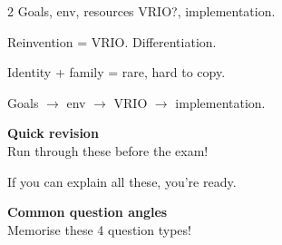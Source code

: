 \documentclass[8pt,landscape,a4paper]{article}
\begin{document}
\begin{multicols}{2}
Goals, env, resources VRIO?, implementation.

Reinvention = VRIO. Differentiation.

Identity + family = rare, hard to copy.

Goals $\to$ env $\to$ VRIO $\to$ implementation.

\textbf{Quick revision}\\
Run through these before the exam!

If you can explain all these, you're ready.

\textbf{Common question angles}\\
Memorise these 4 question types!

\end{multicols}
\vfill
\normalsize\normalfont\color{black}
\end{document}
